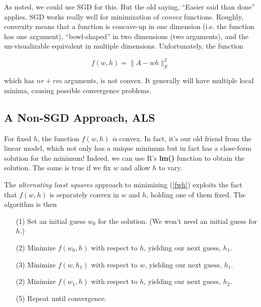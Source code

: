 As noted, we could use SGD for this.  But the old saying, ``Easier said
than done'' applies.  SGD works really well for minimization of
\textit{convex} functions.  Roughly, convexity means that a function
is concave-up in one dimension (i.e. the function has one argument),
``bowl-shaped'' in two dimensions (two arguments), and the
un-visualizable equivalent in multiple dimensions.  Unfortunately, 
the function

\begin{equation}
\label{fwh}
f(w,h) = \|A - wh\|_F^2
\end{equation}

which has $nr + rm$ arguments, is not convex.  It generally will have
multiple local minima, causing possible convergence problems.

\subsection{A Non-SGD Approach, ALS}

For fixed $h$, the function $f(w,h)$ \textit{is} convex.  In
fact, it's our old friend from the linear model, which not only has a
unique minimum but in fact has a close-form solution for the minimum!
Indeed, we can use R's \textbf{lm()} function to obtain the solution.
The same is true if we fix $w$ and allow $h$ to vary.

The \textit{alternating least squares} approach to minimizing (\ref{fwh})
exploits the fact that $f(w,h)$ is separately convex in $w$ and $h$,
holding one of them fixed.  The algorithm is then

\begin{itemize}

\item [(1)] Set an initial guess $w_0$ for the solution.  (We won't need
an initial guess for $h$.)

\item [(2)] Minimize $f(w_0,h)$ with respect to $h$, yielding our next
guess, $h_1$.

\item [(3)] Minimize $f(w,h_1)$ with respect to $w$, yielding our next
guess, $h_1$.

\item [(2)] Minimize $f(w_1,h)$ with respect to $h$, yielding our next
guess, $h_2$.

\item [(5)] Repeat until convergence.

\end{itemize} 

